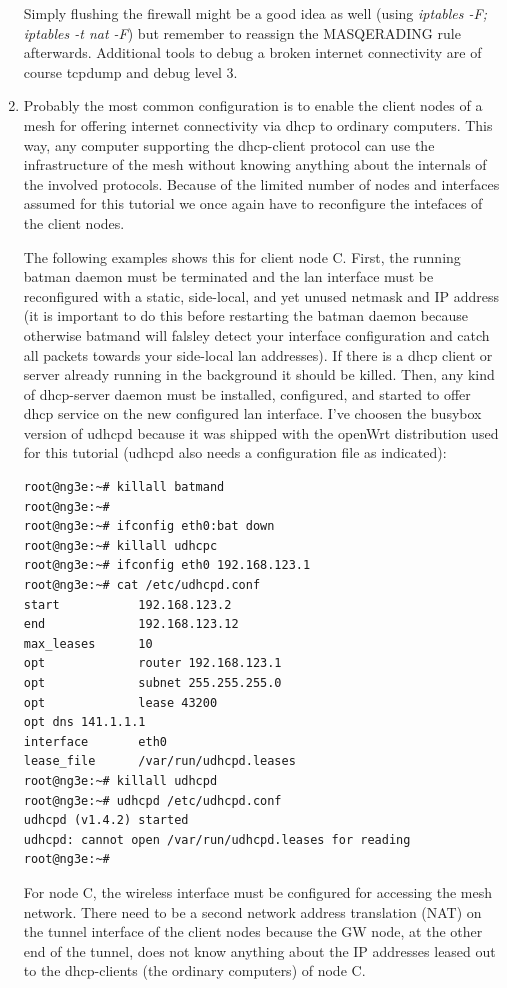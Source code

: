 \documentclass[11pt]{article}
\begin{document}
\begin{enumerate}
Simply flushing the firewall might be a good idea as well (using \emph{iptables -F; iptables -t nat -F}) but remember to reassign the MASQERADING rule afterwards.
Additional tools to debug a broken internet connectivity are of course tcpdump and debug level 3.


\item Probably the most common configuration is to enable the client nodes of a mesh for offering internet connectivity via dhcp to ordinary computers.
%
This way, any computer supporting the dhcp-client protocol can use the infrastructure of the mesh without knowing anything about the internals of the involved protocols.
%
Because of the limited number of nodes and interfaces assumed for this tutorial we once again have to reconfigure the intefaces of the client nodes.
%

The following examples shows this for client node C.
%
First, the running batman daemon must be terminated and the lan interface must be reconfigured with a static, side-local, and yet unused netmask and IP address
(it is important to do this before restarting the batman daemon because otherwise batmand will falsley detect your interface configuration and catch all packets towards your side-local lan addresses).
%
If there is a dhcp client or server already running in the background it should be killed.
Then, any kind of dhcp-server daemon must be installed, configured, and started to offer dhcp service on the new configured lan interface. I've choosen the busybox version of udhcpd because it was shipped with the openWrt distribution used for this tutorial (udhcpd also needs a configuration file as indicated):
\begin{small} \begin{verbatim}
root@ng3e:~# killall batmand
root@ng3e:~#
root@ng3e:~# ifconfig eth0:bat down
root@ng3e:~# killall udhcpc
root@ng3e:~# ifconfig eth0 192.168.123.1
root@ng3e:~# cat /etc/udhcpd.conf
start           192.168.123.2
end             192.168.123.12
max_leases      10
opt             router 192.168.123.1
opt             subnet 255.255.255.0
opt             lease 43200
opt dns 141.1.1.1
interface       eth0
lease_file      /var/run/udhcpd.leases
root@ng3e:~# killall udhcpd
root@ng3e:~# udhcpd /etc/udhcpd.conf
udhcpd (v1.4.2) started
udhcpd: cannot open /var/run/udhcpd.leases for reading
root@ng3e:~#
\end{verbatim} \end{small}

For node C, the wireless interface must be configured for accessing the mesh network.
%
There need to be a second network address translation (NAT) on the tunnel interface of the client nodes because the GW node, at the other end of the tunnel, does not know anything about the IP addresses leased out to the dhcp-clients (the ordinary computers) of node C.


\end{enumerate}
\end{document}
